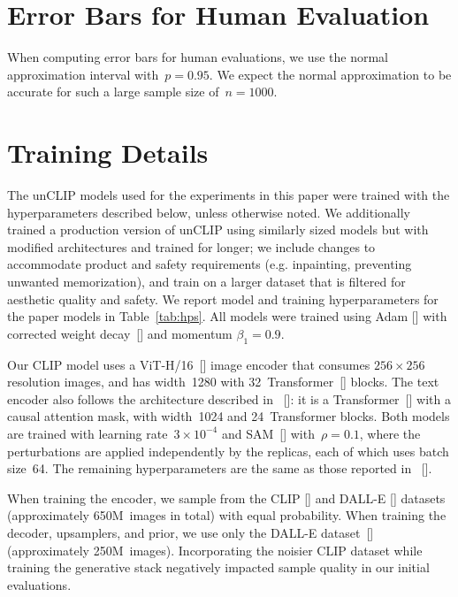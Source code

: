\documentclass{article}
\newcommand{\shortcite}[1]{[\citenum{#1}]}
\newcommand{\namecite}[1]{\citeauthor{#1} [\citenum{#1}]}
\begin{document}
\section{Error Bars for Human Evaluation}
\label{app:error_bars}

When computing error bars for human evaluations, we use the normal approximation interval with~$p=0.95$. We expect the normal approximation to be accurate for such a large sample size of~$n=1000$.

\section{Training Details}
\label{app:hps}
The unCLIP models used for the experiments in this paper were trained with the hyperparameters described below, unless otherwise noted. We additionally trained a production version of unCLIP using similarly sized models but with modified architectures and trained for longer; we include changes to accommodate product and safety requirements (e.g. inpainting, preventing unwanted memorization), and train on a larger dataset that is filtered for aesthetic quality and safety. We report model and training hyperparameters for the paper models in Table~\ref{tab:hps}. All models were trained using Adam \shortcite{adam} with corrected weight decay~\shortcite{adamw} and momentum $\beta_1 = 0.9$.

Our CLIP model uses a ViT-H/16~\shortcite{vit} image encoder that consumes $256 \times 256$ resolution images, and has width~1280 with 32~Transformer~\shortcite{transformer} blocks. The text encoder also follows the architecture described in~\namecite{clip}: it is a Transformer~\shortcite{transformer} with a causal attention mask, with width~1024 and 24~Transformer blocks. Both models are trained with learning rate~$3\times10^{-4}$ and SAM~\shortcite{sam} with~$\rho = 0.1$, where the perturbations are applied independently by the replicas, each of which uses batch size~64. The remaining hyperparameters are the same as those reported in~\namecite{clip}.

When training the encoder, we sample from the CLIP \shortcite{clip} and DALL-E \shortcite{dalle} datasets (approximately 650M~images in total) with equal probability. When training the decoder, upsamplers, and prior, we use only the DALL-E dataset~\shortcite{dalle} (approximately 250M~images). Incorporating the noisier CLIP dataset while training the generative stack negatively impacted sample quality in our initial evaluations. 
\end{document}
